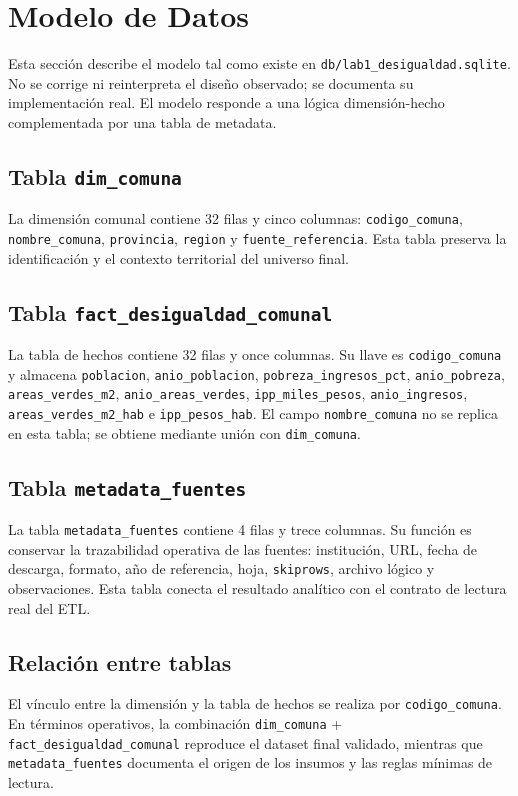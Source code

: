 \chapter{Modelo de Datos}

Esta sección describe el modelo tal como existe en \texttt{db/lab1\_desigualdad.sqlite}. No se corrige ni reinterpreta el diseño observado; se documenta su implementación real. El modelo responde a una lógica dimensión-hecho complementada por una tabla de metadata.



\section{Tabla \texttt{dim\_comuna}}

La dimensión comunal contiene 32 filas y cinco columnas: \texttt{codigo\_comuna}, \texttt{nombre\_comuna}, \texttt{provincia}, \texttt{region} y \texttt{fuente\_referencia}. Esta tabla preserva la identificación y el contexto territorial del universo final.

\section{Tabla \texttt{fact\_desigualdad\_comunal}}

La tabla de hechos contiene 32 filas y once columnas. Su llave es \texttt{codigo\_comuna} y almacena \texttt{poblacion}, \texttt{anio\_poblacion}, \texttt{pobreza\_ingresos\_pct}, \texttt{anio\_pobreza}, \texttt{areas\_verdes\_m2}, \texttt{anio\_areas\_verdes}, \texttt{ipp\_miles\_pesos}, \texttt{anio\_ingresos}, \texttt{areas\_verdes\_m2\_hab} e \texttt{ipp\_pesos\_hab}. El campo \texttt{nombre\_comuna} no se replica en esta tabla; se obtiene mediante unión con \texttt{dim\_comuna}.

\section{Tabla \texttt{metadata\_fuentes}}

La tabla \texttt{metadata\_fuentes} contiene 4 filas y trece columnas. Su función es conservar la trazabilidad operativa de las fuentes: institución, URL, fecha de descarga, formato, año de referencia, hoja, \texttt{skiprows}, archivo lógico y observaciones. Esta tabla conecta el resultado analítico con el contrato de lectura real del ETL.

\section{Relación entre tablas}

El vínculo entre la dimensión y la tabla de hechos se realiza por \texttt{codigo\_comuna}. En términos operativos, la combinación \texttt{dim\_comuna} + \texttt{fact\_desigualdad\_comunal} reproduce el dataset final validado, mientras que \texttt{metadata\_fuentes} documenta el origen de los insumos y las reglas mínimas de lectura.
